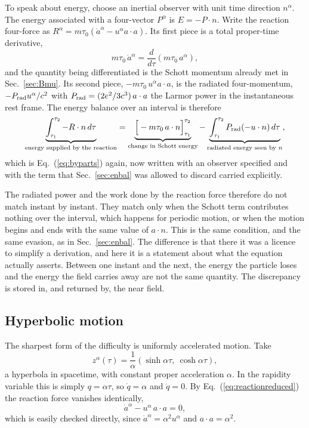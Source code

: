 \documentclass[preprint]{aastex701}
\newcommand{\taunought}{\tau_0}
\begin{document}
To speak about energy, choose an inertial observer with unit time direction
$n^\alpha$. The energy associated with a four-vector $P^\alpha$ is
$E=-P\cdot n$. Write the reaction four-force as
$R^\alpha = m\taunought(\dot a^\alpha - u^\alpha a\cdot a)$. Its first piece is
a total proper-time derivative,
\begin{equation}
m\taunought\,\dot a^\alpha = \frac{d}{d\tau}\left(m\taunought\,a^\alpha\right),
\label{eq:schottderiv}
\end{equation}
and the quantity being differentiated is the Schott momentum already met in
Sec.~\ref{sec:Bmu}. Its second piece, $-m\taunought\,u^\alpha a\cdot a$, is the
radiated four-momentum, $-P_{\rm rad}u^\alpha/c^2$ with
$P_{\rm rad} = (2e^2/3c^3)\,a\cdot a$ the Larmor power in the instantaneous rest
frame. The energy balance over an interval is therefore
\begin{equation}
\underbrace{\int_{\tau_1}^{\tau_2} -R\cdot n\,d\tau}_{\text{energy supplied by the reaction}}
= \underbrace{\Big[-m\taunought\,a\cdot n\Big]_{\tau_1}^{\tau_2}}
  _{\text{change in Schott energy}}
- \underbrace{\int_{\tau_1}^{\tau_2} P_{\rm rad}(-u\cdot n)\,d\tau}
  _{\text{radiated energy seen by }n} ,
\label{eq:LDbalance}
\end{equation}
which is Eq.~(\ref{eq:byparts}) again, now written with an observer specified
and with the term that Sec.~\ref{sec:enbal} was allowed to discard carried
explicitly.

The radiated power and the work done by the reaction force therefore do not
match instant by instant. They match only when the Schott term contributes
nothing over the interval, which happens for periodic motion, or when the
motion begins and ends with the same value of $a\cdot n$. This is the same
condition, and the same evasion, as in Sec.~\ref{sec:enbal}. The difference is
that there it was a licence to simplify a derivation, and here it is a
statement about what the equation actually asserts. Between one instant and the
next, the energy the particle loses and the energy the field carries away are
not the same quantity. The discrepancy is stored in, and returned by, the near
field.

\subsection{Hyperbolic motion}
\label{sec:hyperbolic}

The sharpest form of the difficulty is uniformly accelerated motion. Take
\begin{equation}
z^\alpha(\tau) = \frac{1}{\alpha}\left(\sinh\alpha\tau,\ \cosh\alpha\tau\right),
\label{eq:hyperbolic}
\end{equation}
a hyperbola in spacetime, with constant proper acceleration $\alpha$. In the
rapidity variable this is simply $q = \alpha\tau$, so $\dot q = \alpha$ and
$\ddot q = 0$. By Eq.~(\ref{eq:reactionreduced}) the reaction force vanishes
identically,
\begin{equation}
\dot a^\alpha - u^\alpha\,a\cdot a = 0 ,
\label{eq:hypnoreaction}
\end{equation}
which is easily checked directly, since $\dot a^\alpha = \alpha^2u^\alpha$ and
$a\cdot a = \alpha^2$.
\end{document}
